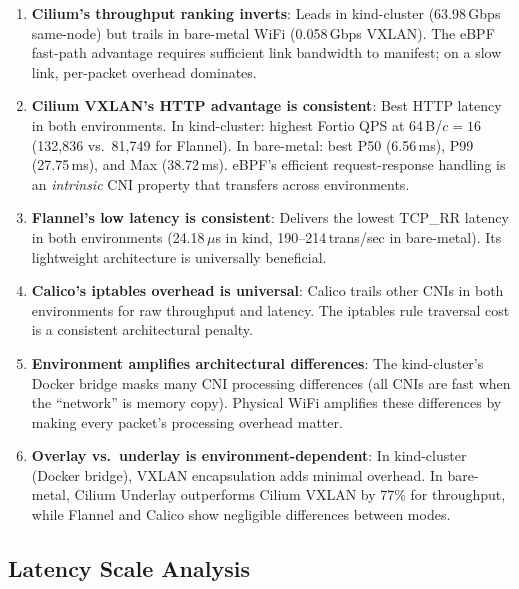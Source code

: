 \documentclass[11pt,a4paper]{article}
\begin{document}
\begin{findingbox}
\begin{enumerate}
  \item \textbf{Cilium's throughput ranking inverts}: Leads in kind-cluster (63.98\,Gbps same-node) but trails in bare-metal WiFi (0.058\,Gbps VXLAN). The eBPF fast-path advantage requires sufficient link bandwidth to manifest; on a slow link, per-packet overhead dominates.

  \item \textbf{Cilium VXLAN's HTTP advantage is consistent}: Best HTTP latency in both environments. In kind-cluster: highest Fortio QPS at 64\,B/$c{=}16$ (132,836 vs.\ 81,749 for Flannel). In bare-metal: best P50 (6.56\,ms), P99 (27.75\,ms), and Max (38.72\,ms). eBPF's efficient request-response handling is an \emph{intrinsic} CNI property that transfers across environments.

  \item \textbf{Flannel's low latency is consistent}: Delivers the lowest TCP\_RR latency in both environments (24.18\,$\mu$s in kind, 190--214\,trans/sec in bare-metal). Its lightweight architecture is universally beneficial.

  \item \textbf{Calico's iptables overhead is universal}: Calico trails other CNIs in both environments for raw throughput and latency. The iptables rule traversal cost is a consistent architectural penalty.

  \item \textbf{Environment amplifies architectural differences}: The kind-cluster's Docker bridge masks many CNI processing differences (all CNIs are fast when the ``network'' is memory copy). Physical WiFi amplifies these differences by making every packet's processing overhead matter.

  \item \textbf{Overlay vs.\ underlay is environment-dependent}: In kind-cluster (Docker bridge), VXLAN encapsulation adds minimal overhead. In bare-metal, Cilium Underlay outperforms Cilium VXLAN by 77\% for throughput, while Flannel and Calico show negligible differences between modes.
\end{enumerate}
\end{findingbox}

\subsection{Latency Scale Analysis}
\end{document}
